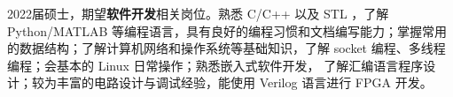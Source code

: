 {\onehalfspacing\hspace{2em}%
2022届硕士，期望\textbf{软件开发}相关岗位。熟悉 C/C++ 以及 STL ，了解 Python/MATLAB 等编程语言，具有良好的编程习惯和文档编写能力；掌握常用的数据结构；了解计算机网络和操作系统等基础知识，了解 socket 编程、多线程编程；会基本的 Linux 日常操作；熟悉嵌入式软件开发， 了解汇编语言程序设计；较为丰富的电路设计与调试经验，能使用 Verilog 语言进行 FPGA 开发。
\par}